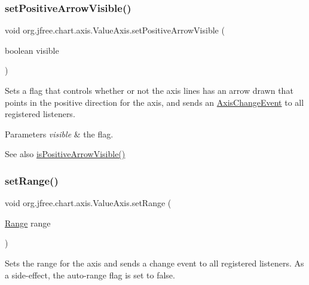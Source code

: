 \subsubsection{\texorpdfstring{set\+Positive\+Arrow\+Visible()}{setPositiveArrowVisible()}}
{\footnotesize\ttfamily void org.\+jfree.\+chart.\+axis.\+Value\+Axis.\+set\+Positive\+Arrow\+Visible (\begin{DoxyParamCaption}\item[{boolean}]{visible }\end{DoxyParamCaption})}

Sets a flag that controls whether or not the axis lines has an arrow drawn that points in the positive direction for the axis, and sends an \mbox{\hyperlink{}{Axis\+Change\+Event}} to all registered listeners.


\begin{DoxyParams}{Parameters}
{\em visible} & the flag.\\
\hline
\end{DoxyParams}
\begin{DoxySeeAlso}{See also}
\mbox{\hyperlink{classorg_1_1jfree_1_1chart_1_1axis_1_1_value_axis_a22d3f1b5a1ecb24e760a2eb9fc49c615}{is\+Positive\+Arrow\+Visible()}} 
\end{DoxySeeAlso}
\mbox{\label{classorg_1_1jfree_1_1chart_1_1axis_1_1_value_axis_a917f68b11632931a40e57551164c181e}} 
\subsubsection{\texorpdfstring{set\+Range()}{setRange()}\hspace{0.1cm}{\footnotesize\ttfamily [1/3]}}
{\footnotesize\ttfamily void org.\+jfree.\+chart.\+axis.\+Value\+Axis.\+set\+Range (\begin{DoxyParamCaption}\item[{\mbox{\hyperlink{classorg_1_1jfree_1_1data_1_1_range}{Range}}}]{range }\end{DoxyParamCaption})}

Sets the range for the axis and sends a change event to all registered listeners. As a side-\/effect, the auto-\/range flag is set to {\ttfamily false}.


